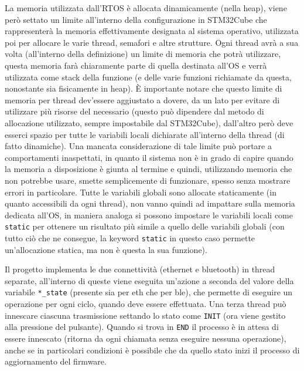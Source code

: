 La memoria utilizzata dall'RTOS \`e allocata dinamicamente (nella heap), viene per\`o settato un limite all'interno della configurazione in STM32Cube che rappresenter\`a la memoria effettivamente designata al sistema operativo, utilizzata poi per allocare le varie thread, semafori e altre strutture. Ogni thread avr\`a a sua volta (all'interno della definizione) un limite di memoria che potr\`a utilizzare, questa memoria far\`a chiaramente parte di quella destinata all'OS e verr\`a utilizzata come stack della funzione (e delle varie funzioni richiamate da questa, nonostante sia fisicamente in heap). \`E importante notare che questo limite di memoria per thread dev'essere aggiustato a dovere, da un lato per evitare di utilizzare pi\`u risorse del necessario (questo pu\`o dipendere dal metodo di allocazione utilizzato, sempre impostabile dal STM32Cube), dall'altro per\`o deve esserci spazio per tutte le variabili locali dichiarate all'interno della thread (di fatto dinamiche). Una mancata considerazione di tale limite pu\`o portare a comportamenti inaspettati, in quanto il sistema non \`e in grado di capire quando la memoria a disposizione \`e giunta al termine e quindi, utilizzando memoria che non potrebbe usare, smette semplicemente di funzionare, spesso senza mostrare errori in particolare. Tutte le variabili globali sono allocate staticamente (in quanto accessibili da ogni thread), non vanno quindi ad impattare sulla memoria dedicata all'OS, in maniera analoga si possono impostare le variabili locali come \texttt{static} per ottenere un risultato pi\`u simile a quello delle variabili globali (con tutto ci\`o che ne consegue, la keyword \texttt{static} in questo caso permette un'allocazione statica, ma non \`e questa la sua funzione).

Il progetto implementa le due connettivit\`a (ethernet e bluetooth) in thread separate, all'interno di queste viene eseguita un'azione a seconda del valore della variabile \texttt{*\_state} (presente sia per eth che per ble), che permette di eseguire un operazione per ogni ciclo, quando deve essere effettuata. Una terza thread pu\`o innescare ciascuna trasmissione settando lo stato come \texttt{INIT} (ora viene gestito alla pressione del pulsante). Quando si trova in \texttt{END} il processo \`e in attesa di essere innescato (ritorna da ogni chiamata senza eseguire nessuna operazione), anche se in particolari condizioni \`e possibile che da quello stato inizi il processo di aggiornamento del firmware.

